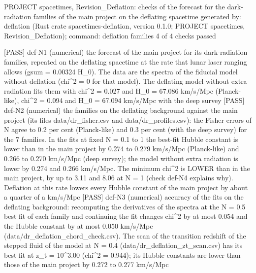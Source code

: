 \documentclass[
  10pt,
]{article}
\newenvironment{Shaded}{}{}
\newcommand{\NormalTok}[1]{#1}
\begin{document}
\begin{Shaded}
\begin{Highlighting}[]
\NormalTok{PROJECT spacetimes, Revision\_Deflation: checks of the forecast for the dark{-}radiation families of the main project on the deflating spacetime}
\NormalTok{generated by: deflation (Rust crate spacetimes{-}deflation, version 0.1.0; PROJECT spacetimes, Revision\_Deflation); command: deflation families}
\NormalTok{4 of 4 checks passed}

\NormalTok{[PASS] def{-}N1  (numerical) the forecast of the main project for its dark{-}radiation families, repeated on the deflating spacetime at the rate that lunar laser ranging allows (gsum = 0.00324 H\_0). The data are the spectra of the fiducial model without deflation (chi\^{}2 = 0 for that model). The deflating model without extra radiation fits them with chi\^{}2 = 0.027 and H\_0 = 67.086 km/s/Mpc (Planck{-}like), chi\^{}2 = 0.094 and H\_0 = 67.094 km/s/Mpc with the deep survey}
\NormalTok{[PASS] def{-}N2  (numerical) the families on the deflating background against the main project (its files data/dr\_fisher.csv and data/dr\_profiles.csv): the Fisher errors of N agree to 0.2 per cent (Planck{-}like) and 0.3 per cent (with the deep survey) for the 7 families. In the fits at fixed N = 0.1 to 1 the best{-}fit Hubble constant is lower than in the main project by 0.274 to 0.279 km/s/Mpc (Planck{-}like) and 0.266 to 0.270 km/s/Mpc (deep survey); the model without extra radiation is lower by 0.274 and 0.266 km/s/Mpc. The minimum chi\^{}2 is LOWER than in the main project, by up to 3.11 and 8.06 at N = 1 (check def{-}N4 explains why). Deflation at this rate lowers every Hubble constant of the main project by about a quarter of a km/s/Mpc}
\NormalTok{[PASS] def{-}N3  (numerical) accuracy of the fits on the deflating background: recomputing the derivatives of the spectra at the N = 0.5 best fit of each family and continuing the fit changes chi\^{}2 by at most 0.054 and the Hubble constant by at most 0.050 km/s/Mpc (data/dr\_deflation\_chord\_check.csv). The scan of the transition redshift of the stepped fluid of the model at N = 0.4 (data/dr\_deflation\_zt\_scan.csv) has its best fit at z\_t = 10\^{}3.00 (chi\^{}2 = 0.944); its Hubble constants are lower than those of the main project by 0.272 to 0.277 km/s/Mpc}

\end{Highlighting}
\end{Shaded}
\end{document}
